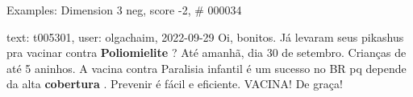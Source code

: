 \begin{frame}{Examples: Dimension 3 neg, score -2, \# 000034}
\footnotesize
\begin{alertblock}{text: t005301, user: olgachaim, 2022-09-29}
Oi, bonitos. Já levaram seus pikashus pra vacinar contra \textbf{Poliomielite} 
? Até amanhã, dia 30 de setembro. Crianças de até 5 aninhos. A vacina contra 
Paralisia infantil é um sucesso no BR pq depende da alta \textbf{cobertura} . 
Prevenir é fácil e eficiente. VACINA! De graça! 
\end{alertblock}
\end{frame}
